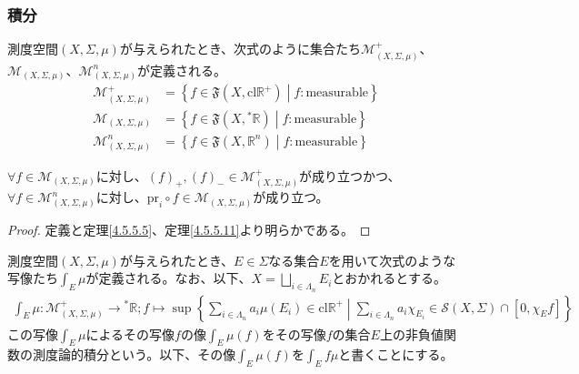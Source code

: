 \documentclass[dvipdfmx]{jsarticle}
\begin{document}
\subsubsection{積分}%
\begin{dfn}
測度空間$(X,\varSigma,\mu)$が与えられたとき、次式のように集合たち$\mathcal{M}_{(X,\varSigma,\mu)}^{+}$、$\mathcal{M}_{(X,\varSigma,\mu)}$、$\mathcal{M}_{(X,\varSigma,\mu)}^{n}$が定義される。
\begin{align*}
\mathcal{M}_{(X,\varSigma,\mu)}^{+} &= \left\{ f \in \mathfrak{F}\left( X,\mathrm{cl}\mathbb{R}^{+} \right) \middle| f:\mathrm{measurable} \right\}\\
\mathcal{M}_{(X,\varSigma,\mu)} &= \left\{ f \in \mathfrak{F}\left( X,{}^{*}\mathbb{R} \right) \middle| f:\mathrm{measurable} \right\}\\
\mathcal{M}_{(X,\varSigma,\mu)}^{n} &= \left\{ f \in \mathfrak{F}\left( X,\mathbb{R}^{n} \right) \middle| f:\mathrm{measurable} \right\}
\end{align*}
\end{dfn}
\begin{thm}\label{4.6.1.6}
$\forall f \in \mathcal{M}_{(X,\varSigma,\mu)}$に対し、$(f)_{+},(f)_{-} \in \mathcal{M}_{(X,\varSigma,\mu)}^{+}$が成り立つかつ、$\forall f \in \mathcal{M}_{(X,\varSigma,\mu)}^{n}$に対し、$\mathrm{pr}_{i} \circ f \in \mathcal{M}_{(X,\varSigma,\mu)}$が成り立つ。
\end{thm}
\begin{proof} 定義と定理\ref{4.5.5.5}、定理\ref{4.5.5.11}より明らかである。
\end{proof}
\begin{dfn}
測度空間$(X,\varSigma,\mu)$が与えられたとき、$E \in \varSigma$なる集合$E$を用いて次式のような写像たち$\int_{E} \mu$が定義される。なお、以下、$X = \bigsqcup_{i \in \varLambda_{n}} E_{i}$とおかれるとする。
\begin{align*}
\int_{E} \mu:\mathcal{M}_{(X,\varSigma,\mu)}^{+} \rightarrow{}^{*}\mathbb{R};f \mapsto \sup\left\{ \sum_{i \in \varLambda_{n}} {a_{i}\mu\left( E_{i} \right)} \in \mathrm{cl}\mathbb{R}^{+} \middle| \sum_{i \in \varLambda_{n}} {a_{i}\chi_{E_{i}}}\in \mathcal{S}(X,\varSigma) \cap \left[ 0,\chi_{E}f \right] \right\}
\end{align*}
この写像$\int_{E} \mu$によるその写像$f$の像$\int_{E} \mu(f)$をその写像$f$の集合$E$上の非負値関数の測度論的積分という。以下、その像$\int_{E} \mu(f)$を$\int_{E} {f\mu}$と書くことにする。
\end{dfn}
\end{document}
